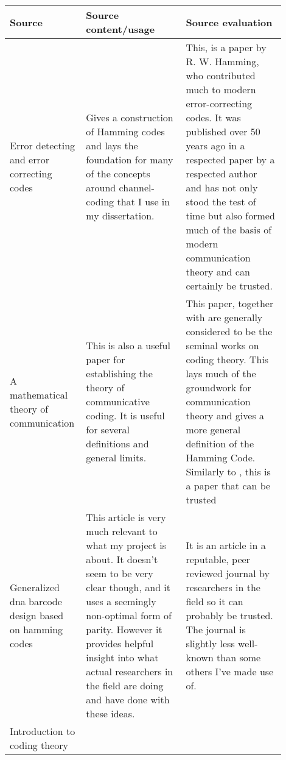 \documentclass{article}
\begin{document}
    \begin{center}
    {
    \renewcommand{\arraystretch}{2.0}
    \begin{longtable}{p{0.2\linewidth} p{0.35\linewidth} p{0.35\linewidth}} \toprule
    Source & Source content/usage & Source evaluation \\ \midrule

    Error detecting and error correcting codes \citep*{Codes1950Hamming} &

    Gives a construction of Hamming codes and lays the foundation for many of
    the concepts around channel-coding that I use in my dissertation. &

    This, is a paper by R. W. Hamming, who contributed much to modern
    error-correcting codes. It was published over 50 years ago in a respected
    paper by a respected author and has not only stood the test of time but
    also formed much of the basis of modern communication theory and can
    certainly be trusted.  \\

    A mathematical theory of communication \citep*{Communication1948Shannon} & 

    This is also a useful paper for establishing the theory of communicative
    coding. It is useful for several definitions and general limits. &

    This paper, together with \citep*{Codes1950Hamming} are generally
    considered to be the seminal works on coding theory. This lays much of the
    groundwork for communication theory and gives a more general definition of
    the Hamming Code. Similarly to \citep*{Codes1950Hamming}, this is a paper
    that can be trusted \\

    Generalized dna barcode design based on hamming codes \citep*{HammingBarcodes2012BystrykhLeonid} &

    This article is very much relevant to what my project is about. It doesn't
    seem to be very clear though, and it uses a seemingly non-optimal form of
    parity. However it provides helpful insight into what actual researchers in
    the field are doing and have done with these ideas. &

    It is an article in a reputable, peer reviewed journal by researchers in
    the field so it can probably be trusted. The journal is slightly less
    well-known than some others I've made use of. \\

    Introduction to coding theory \citep*{CodeIntro2010Guruswami} &


\end{longtable}}
\end{center}
\end{document}
